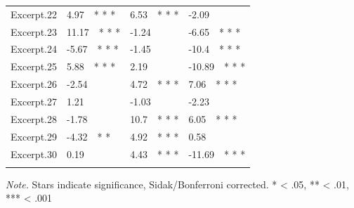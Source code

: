 \documentclass[
]{article}
\begin{document}
\begin{table}[tbp]
\begin{center}
\begin{threeparttable}
\begin{tabular}{llll}
Excerpt.22 & 4.97\ \ * * * & 6.53\ \ * * * & -2.09\\
Excerpt.23 & 11.17\ \ * * * & -1.24 & -6.65\ \ * * *\\
Excerpt.24 & -5.67\ \ * * * & -1.45 & -10.4\ \ * * *\\
Excerpt.25 & 5.88\ \ * * * & 2.19 & -10.89\ \ * * *\\
Excerpt.26 & -2.54 & 4.72\ \ * * * & 7.06\ \ * * *\\
Excerpt.27 & 1.21 & -1.03 & -2.23\\
Excerpt.28 & -1.78 & 10.7\ \ * * * & 6.05\ \ * * *\\
Excerpt.29 & -4.32\ \ * * & 4.92\ \ * * * & 0.58\\
Excerpt.30 & 0.19 & 4.43\ \ * * * & -11.69\ \ * * *\\
\bottomrule
\addlinespace
\end{tabular}

\begin{tablenotes}[para]
\normalsize{\textit{Note.} Stars indicate significance, Sidak/Bonferroni corrected. 
* < .05, ** < .01, *** < .001}
\end{tablenotes}

\end{threeparttable}
\end{center}

\end{table}
\end{document}

